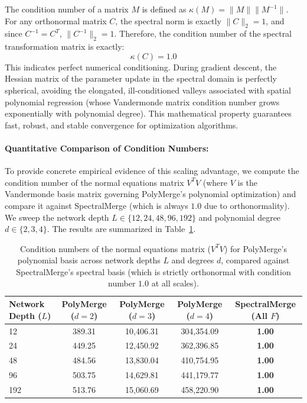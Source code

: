 \documentclass{article}
\theoremstyle{plain}
\theoremstyle{definition}
\theoremstyle{remark}
\begin{document}
The condition number of a matrix $M$ is defined as $\kappa(M) = \|M\| \|M^{-1}\|$. For any orthonormal matrix $C$, the spectral norm is exactly $\|C\|_2 = 1$, and since $C^{-1} = C^T$, $\|C^{-1}\|_2 = 1$. Therefore, the condition number of the spectral transformation matrix is exactly:
\begin{equation}
    \kappa(C) = 1.0
\end{equation}
This indicates perfect numerical conditioning. During gradient descent, the Hessian matrix of the parameter update in the spectral domain is perfectly spherical, avoiding the elongated, ill-conditioned valleys associated with spatial polynomial regression (whose Vandermonde matrix condition number grows exponentially with polynomial degree). This mathematical property guarantees fast, robust, and stable convergence for optimization algorithms.

\paragraph{Quantitative Comparison of Condition Numbers:}
To provide concrete empirical evidence of this scaling advantage, we compute the condition number of the normal equations matrix $V^T V$ (where $V$ is the Vandermonde basis matrix governing PolyMerge's polynomial optimization) and compare it against SpectralMerge (which is always $1.0$ due to orthonormality). We sweep the network depth $L \in \{12, 24, 48, 96, 192\}$ and polynomial degree $d \in \{2, 3, 4\}$. The results are summarized in Table~\ref{tab:conditioning_comparison}.

\begin{table}[h]
\caption{Condition numbers of the normal equations matrix ($V^T V$) for PolyMerge's polynomial basis across network depths $L$ and degrees $d$, compared against SpectralMerge's spectral basis (which is strictly orthonormal with condition number $1.0$ at all scales).}
\label{tab:conditioning_comparison}
\vskip 0.15in
\begin{center}
\begin{small}
\begin{sc}
\begin{tabular}{lcccc}
\toprule
Network Depth ($L$) & PolyMerge ($d=2$) & PolyMerge ($d=3$) & PolyMerge ($d=4$) & \textbf{SpectralMerge (All $F$)} \\
\midrule
12 & 389.31 & 10,406.31 & 304,354.09 & \textbf{1.00} \\
24 & 449.25 & 12,450.92 & 362,396.85 & \textbf{1.00} \\
48 & 484.56 & 13,830.04 & 410,754.95 & \textbf{1.00} \\
96 & 503.75 & 14,629.81 & 441,179.77 & \textbf{1.00} \\
192 & 513.76 & 15,060.69 & 458,220.90 & \textbf{1.00} \\
\bottomrule
\end{tabular}
\end{sc}
\end{small}
\end{center}
\vskip -0.1in
\end{table}
\end{document}
